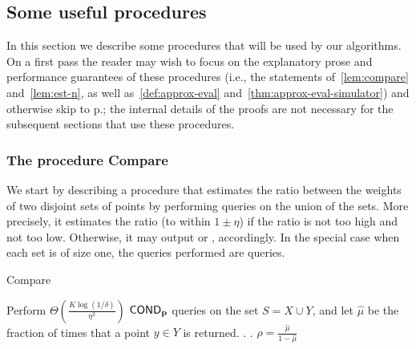 \subsection{Some useful procedures}
In this section we describe some procedures that will be used by our algorithms. On a first pass the reader may wish to focus on the explanatory prose and performance guarantees of these procedures (i.e., the statements of~\cref{lem:compare} and~\cref{lem:est-n}, as well as~\cref{def:approx-eval} and~\cref{thm:approx-eval-simulator}) and otherwise skip to p.\pageref{sec:uniform}; the internal details of the proofs are not necessary for the subsequent sections that use these procedures.

\subsubsection{The procedure {\sc Compare}}\label{subsec:compare}
We start by describing a procedure that estimates the ratio between the
weights of two disjoint sets of points by performing \COND queries on
the union of the sets.
More precisely, it estimates the ratio (to within $1\pm\eta$) if the ratio is not
too high and not too low. Otherwise, it may output \high or \low, accordingly.
In the special case
when each set is of size one, the queries performed
are \PCOND queries.

\begin{algorithm}[ht!]
\caption{{\sc Compare}}\label{alg:compare}
\begin{algorithmic}[1]
\Require{\COND query access to a distribution $\D$ over $[n]$, disjoint subsets $X,Y \subset [n]$, parameter $\eta\in (0,1]$, $K \geq 1$, and $\delta\in (0,1/2]$.}
\State\label{alg:compare-st1} Perform $\Theta\!\left(\frac{K\log(1/\delta)}{\eta^2}\right)$ ${\sf COND}_{\mathbf{p}}$ queries on the set $S = X\cup Y$, and let $\hat{\mu}$ be the fraction of
times that a point $y \in Y$ is returned.
 \Return \low.
 \Return \high.
\Else
  \State \Return $\rho = \frac{\hat{\mu}}{1-\hat{\mu}}$
\EndIf
\end{algorithmic}
\end{algorithm}


